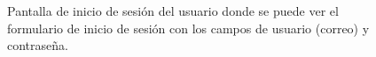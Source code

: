 \begin{figure}[H]%
  \centering
  \qquad
  \caption{Pantalla de inicio de sesión del usuario donde se puede ver el formulario de inicio de sesión con los campos de usuario (correo) y contraseña.}%
  \label{fig:login}%
\end{figure}


